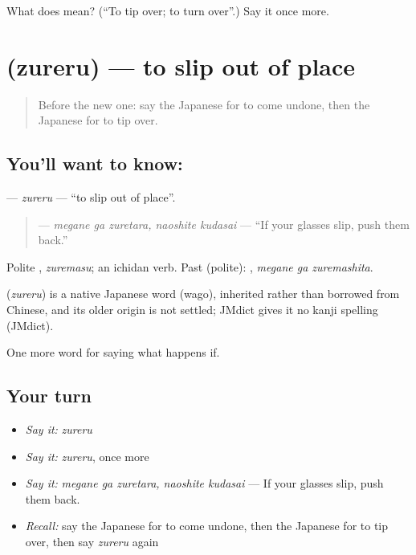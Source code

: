 \begin{tcolorbox}[breakable,colback=teal!4,colframe=teal!35!black,title={Before you move on}]
What does  mean? (\textquotedblleft{}To tip over; to turn over\textquotedblright{}.) Say it once more.
\end{tcolorbox}
\section[\texorpdfstring{\ja{ずれる} (zureru)}{ずれる (zureru)}]{ (zureru) — to slip out of place}

\label{lesson:JA-C352-zureru}



\begin{quote}
Before the new one: say the Japanese for to come undone, then the Japanese for to tip over.
\end{quote}

\subsection*{You'll want to know: }
\textbf{} — \emph{zureru} — \textquotedblleft{}to slip out of place\textquotedblright{}.

\begin{quote}
\textbf{  } — \emph{megane ga zuretara, naoshite kudasai} — \textquotedblleft{}If your glasses slip, push them back.\textquotedblright{}
\end{quote}

Polite \textbf{}, \emph{zuremasu}; an ichidan verb. Past (polite): \textbf{ }, \emph{megane ga zuremashita}.

\begin{cousinweb}
\textbf{} (\emph{zureru}) is a native Japanese word (wago), inherited rather than borrowed from Chinese, and its older origin is not settled; JMdict gives it no kanji spelling (JMdict).
\end{cousinweb}

\begin{grammarlens}[title={What you've built}]
One more word for saying what happens if.
\end{grammarlens}

\subsection*{Your turn}
\begin{itemize}
\raggedright
  \item \emph{Say it:} \emph{zureru}
  \item \emph{Say it:} \emph{zureru}, once more
  \item \emph{Say it:} \emph{megane ga zuretara, naoshite kudasai} — If your glasses slip, push them back.
  \item \emph{Recall:} say the Japanese for to come undone, then the Japanese for to tip over, then say \emph{zureru} again
\end{itemize}

